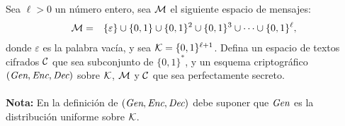 

Sea $\ell > 0$ un número entero, sea $\mathcal{M}$ el siguiente espacio de mensajes:
\begin{eqnarray*}
  \mathcal{M} &=& \{\varepsilon\} \cup \{0,1\} \cup \{0,1\}^2 \cup \{0,1\}^3 \cup \cdots \cup
  \{0,1\}^{\ell},
\end{eqnarray*}
donde $\varepsilon$ es la palabra vacía, y sea $\mathcal{K}
= \{0,1\}^{\ell+1}$. Defina un espacio de textos cifrados $\mathcal{C}$ que sea
subconjunto de $\{0,1\}^*$, y un esquema criptográfico
$(\textit{Gen}, \textit{Enc}, \textit{Dec})$ sobre $\mathcal{K}$, $\mathcal{M}$ y $\mathcal{C}$ que sea perfectamente secreto.
\\
\\
{\bf Nota:} En la definición de $(\textit{Gen}, \textit{Enc}, \textit{Dec})$ debe
suponer que $\textit{Gen}$ es la distribución uniforme sobre $\mathcal{K}$.
